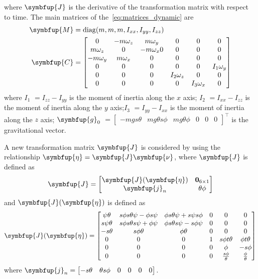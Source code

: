 %
where \(\symbfup{J}\) is the derivative of the transformation matrix with respect to time. 
The main matrices of the~\cref{eq:matrices_dynamic} are
%
\begin{align}
    \symbfup{M} &= \diag(m,m,m,I_{xx},I_{yy},I_{zz})
    \label{eq:diag_M} \\
    \symbfup{C} &= \begin{bmatrix}
        0 & -m\omega_z & m\omega_y & 0 & 0 & 0 \\
        m\omega_z & 0 & -m\omega_x 0 & 0 & 0 & 0\\
        -m\omega_y & m\omega_x & 0 & 0 & 0 & 0 \\
        0 & 0 & 0 & 0 & 0 & I_1\omega_y \\
        0 & 0 & 0 & I_2\omega_z & 0 & 0 \\
        0 & 0 & 0 & 0 & I_3\omega_x& 0 \\
    \end{bmatrix}
    \label{eq:coriolis_matrix}
\end{align}
%
where \(I_1\) \(=I_{zz}-I_{yy}\) is the moment of inertia along the \(x\) axis; \(I_2\) \(=I_{xx}-I_{zz}\) is the moment of inertia along the \(y\) axis;\(I_3\) \(=I_{yy}-I_{xx}\) is the moment of inertia along the \(z\) axis; \(\symbfup{g}_0\) \(= \begin{bmatrix} -mgs\theta & mg\theta s\phi & mg\theta \phi & 0 & 0 & 0\end{bmatrix}^{\intercal}\) is the gravitational vector.


A new transformation matrix \(\symbfup{J}\) is considered by using the relationship \(\symbfup{\eta} = \symbfup{J}\symbfup{\nu}\), where \(\symbfup{J}\) is defined as
%
\begin{equation}
    \symbfup{J} = \begin{bmatrix}
        \symbfup{J}(\symbfup{\eta}) & \mathbf{0}_{6\times 1} \\
        \symbfup{j}_n & \theta\phi
    \end{bmatrix}
    \label{eq:transformation}
\end{equation}
%
and \(\symbfup{J}(\symbfup{\eta})\) is defined as
%
\begin{equation}
    \symbfup{J}(\symbfup{\eta}) = \begin{bmatrix}
        \psi \theta & s\phi s\theta \psi - \phi s\psi & \phi s\theta \psi + s \psi s\phi & 0 & 0 & 0 \\
        s\psi \theta & s\phi s\theta s\psi + \phi \psi & \phi s\theta s \psi - s\phi \psi & 0 & 0 & 0 \\
        -s\theta & s\phi \theta & \phi \theta & 0 & 0 & 0 \\
        0 & 0 & 0 & 1 & s\phi t\theta & \phi t\theta \\
        0 & 0 & 0 & 0 & \phi & -s\phi \\
        0 & 0 & 0 & 0 & \frac{s\phi}{\theta} & \frac{\phi}{\theta}
    \end{bmatrix}
\end{equation}
%
where \(\symbfup{j}_n = \begin{bmatrix}-s\theta & \theta s\phi & 0 & 0 & 0 & 0 \end{bmatrix}\).

